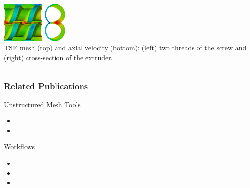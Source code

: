 \documentclass{beamer}
\begin{document}
\begin{frame}
\begin{columns}
\begin{column}{0.5\textwidth}
      \includegraphics[height=2.0cm,keepaspectratio]{../applications/figures/tseFlowTwoThreads.png}
      \includegraphics[height=2.0cm,keepaspectratio]{../applications/figures/tseFlowCrossSection.png}\\
      \small
      TSE mesh (top) and axial velocity (bottom): (left) two threads of the
      screw and (right) cross-section of the extruder.
    \end{column}
  \end{columns}
\end{frame}


\begin{frame}
  \frametitle{Related Publications}
  Unstructured Mesh Tools\\
  {\footnotesize
  \begin{itemize}
    \item {}
    \item {}
  \end{itemize}
  }
  Workflows\\
  {\footnotesize
  \begin{itemize}
    \item {}
    \item {}
    \item {}
  \end{itemize}
  }
\end{frame}
\end{document}
